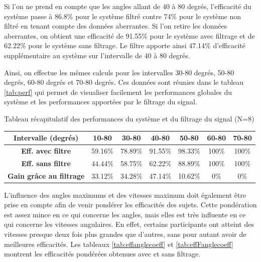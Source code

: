 \documentclass[letterpaper, twoside, 12pt, memoire, creativecommons, hyperref]{thETS}
\begin{document}
Si l'on ne prend en compte que les angles allant de 40 à 80 degrés, l'efficacité du système passe à 86.8\% pour le système filtré contre 74\% pour le système non filtré en tenant compte des données aberrantes. Si l'on retire les données aberrantes, on obtient une efficacité de 91.55\% pour le système avec filtrage et de 62.22\% pour le système sans filtrage. Le filtre apporte ainsi 47.14\% d'efficacité supplémentaire au système sur l'intervalle de 40 à 80 degrés.

Ainsi, on effectue les mêmes calculs pour les intervalles 30-80 degrés, 50-80 degrés, 60-80 degrés et 70-80 degrés. Ces données sont réunies dans le tableau \ref{tab:perf} qui permet de visualiser facilement les performances globales du système et les performances apportées par le filtrage du signal.

\begin{tableap}[*ht]
	\caption{Tableau récapitulatif des performances du système et du filtrage du signal (N=8)}
		\begin{tabular}{|c|c|c|c|c|c|c|}
		\hline
			{\bf Intervalle (degrés)} & {\bf 10-80} & {\bf 30-80} & {\bf 40-80} & {\bf 50-80} & {\bf 60-80} & {\bf 70-80} \\
	  \hline
			{\bf Eff. avec filtre} & 59.16\% & 78.89\% & 91.55\% & 98.33\% & 100\% & 100\% \\
	  \hline
			{\bf Eff. sans filtre} & 44.44\% & 58.75\% & 62.22\% & 88.89\% & 100\% & 100\% \\
	  \hline
			{\bf Gain grâce au filtrage} & 33.12\% & 34.28\% & 47.14\% & 10.62\% & 0\% & 0\% \\
	  \hline
		\end{tabular}
	\label{tab:perf}
\end{tableap}

L'influence des angles maximums et des vitesses maximum doit également être prise en compte afin de venir pondérer les efficacités des sujets. Cette pondération est assez mince en ce qui concerne les angles, mais elles est très influente en ce qui concerne les vitesses angulaires. En effet, certains participants ont atteint des vitesses presque deux fois plus grandes que d'autres, sans pour autant avoir de meilleures efficacités. Les tableaux \ref{tab:effanglecoeff} et \ref{tab:effFanglecoeff} montrent les efficacités pondérées obtenues avec et sans filtrage.
\end{document}
